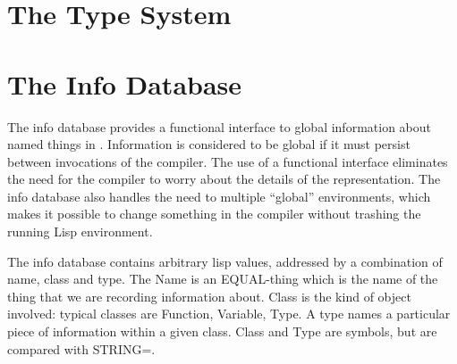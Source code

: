 \chapter{The Type System}



\chapter{The Info Database}

The info database provides a functional interface to global
information about named things in \cmucl{}. Information is considered to
be global if it must persist between invocations of the compiler. The
use of a functional interface eliminates the need for the compiler to
worry about the details of the representation. The info database also
handles the need to multiple ``global'' environments, which makes it
possible to change something in the compiler without trashing the
running Lisp environment.

The info database contains arbitrary lisp values, addressed by a
combination of name, class and type. The Name is an EQUAL-thing which
is the name of the thing that we are recording information about.
Class is the kind of object involved: typical classes are Function,
Variable, Type. A type names a particular piece of information within
a given class. Class and Type are symbols, but are compared with
STRING=.

